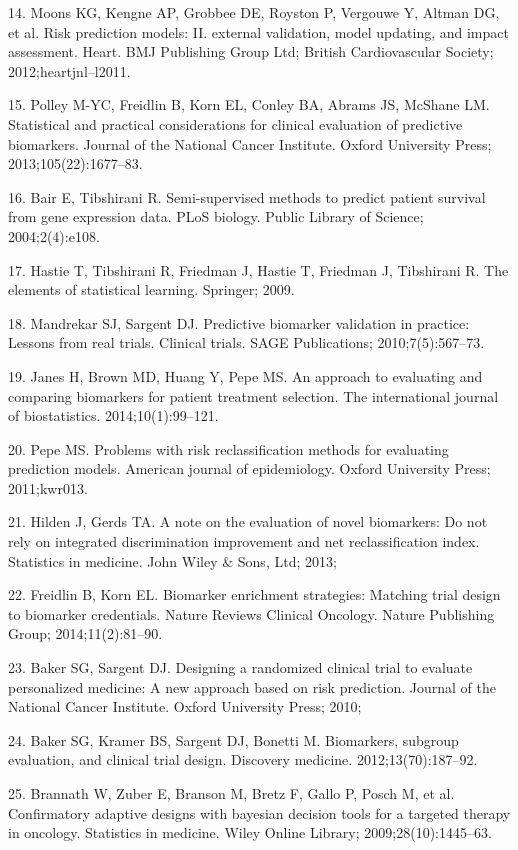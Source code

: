 \documentclass[11pt]{article}
\begin{document}
14. Moons KG, Kengne AP, Grobbee DE, Royston P, Vergouwe Y, Altman DG,
et al. Risk prediction models: II. external validation, model updating,
and impact assessment. Heart. BMJ Publishing Group Ltd; British
Cardiovascular Society; 2012;heartjnl--l2011.

15. Polley M-YC, Freidlin B, Korn EL, Conley BA, Abrams JS, McShane LM.
Statistical and practical considerations for clinical evaluation of
predictive biomarkers. Journal of the National Cancer Institute. Oxford
University Press; 2013;105(22):1677--83.

16. Bair E, Tibshirani R. Semi-supervised methods to predict patient
survival from gene expression data. PLoS biology. Public Library of
Science; 2004;2(4):e108.

17. Hastie T, Tibshirani R, Friedman J, Hastie T, Friedman J, Tibshirani
R. The elements of statistical learning. Springer; 2009.

18. Mandrekar SJ, Sargent DJ. Predictive biomarker validation in
practice: Lessons from real trials. Clinical trials. SAGE Publications;
2010;7(5):567--73.

19. Janes H, Brown MD, Huang Y, Pepe MS. An approach to evaluating and
comparing biomarkers for patient treatment selection. The international
journal of biostatistics. 2014;10(1):99--121.

20. Pepe MS. Problems with risk reclassification methods for evaluating
prediction models. American journal of epidemiology. Oxford University
Press; 2011;kwr013.

21. Hilden J, Gerds TA. A note on the evaluation of novel biomarkers: Do
not rely on integrated discrimination improvement and net
reclassification index. Statistics in medicine. John Wiley \& Sons, Ltd;
2013;

22. Freidlin B, Korn EL. Biomarker enrichment strategies: Matching trial
design to biomarker credentials. Nature Reviews Clinical Oncology.
Nature Publishing Group; 2014;11(2):81--90.

23. Baker SG, Sargent DJ. Designing a randomized clinical trial to
evaluate personalized medicine: A new approach based on risk prediction.
Journal of the National Cancer Institute. Oxford University Press; 2010;

24. Baker SG, Kramer BS, Sargent DJ, Bonetti M. Biomarkers, subgroup
evaluation, and clinical trial design. Discovery medicine.
2012;13(70):187--92.

25. Brannath W, Zuber E, Branson M, Bretz F, Gallo P, Posch M, et al.
Confirmatory adaptive designs with bayesian decision tools for a
targeted therapy in oncology. Statistics in medicine. Wiley Online
Library; 2009;28(10):1445--63.
\end{document}
